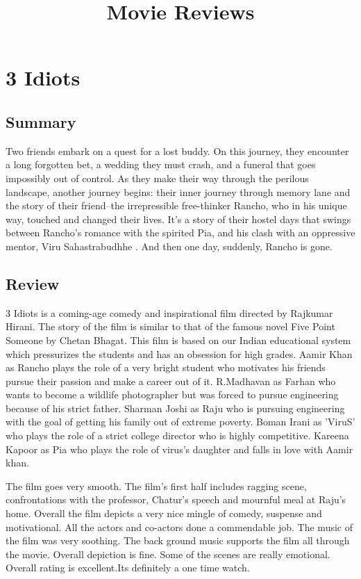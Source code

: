 \documentclass[11pt]{article} %
\title{Movie Reviews}
\author{}
\begin{document}
\maketitle

\section{3 Idiots}
\subsection{Summary}
Two friends embark on a quest for a lost buddy. On this journey, they encounter a long forgotten bet, a wedding they must crash, and a funeral that goes impossibly out of control. As they make their way through the perilous landscape, another journey begins: their inner journey through memory lane and the story of their friend--the irrepressible free-thinker Rancho, who in his unique way, touched and changed their lives. It’s a story of their hostel days that swings between Rancho’s romance with the spirited Pia, and his clash with an oppressive mentor, Viru Sahastrabudhhe . And then one day, suddenly, Rancho is gone.

\subsection{Review}
3 Idiots is a coming-age comedy and inspirational film directed by Rajkumar Hirani. The story of the film is similar to that of the famous novel Five Point Someone by Chetan Bhagat. This film is based on our Indian educational system which pressurizes the students and has an obsession for high grades.  Aamir Khan as Rancho plays the role of a very bright student who motivates his friends pursue their passion and make a career out of it. R.Madhavan as Farhan who wants to become a wildlife photographer but was forced to pursue engineering because of his strict father. Sharman Joshi as Raju who is pursuing engineering with the goal of getting his family out of extreme poverty. Boman Irani as 'ViruS' who plays the role of a strict college director who is highly competitive. Kareena Kapoor as Pia who plays the role of virus’s daughter and falls in love with Aamir khan.

The film goes very smooth. The film’s first half includes ragging scene, confrontations with the professor, Chatur’s speech and mournful meal at Raju’s home. Overall the film depicts a very nice mingle of comedy, suspense and motivational. All the actors and co-actors done a commendable job. The music of the film was very soothing. The back ground music supports the film all through the movie. Overall depiction is fine. Some of the scenes are really emotional. Overall rating is excellent.Its definitely a one time watch.
\end{document}
